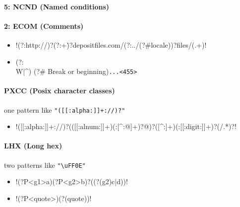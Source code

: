 \vspace{-2mm}
\paragraph{5: NCND (Named conditions)}

\vspace{-2mm}
\paragraph{2: ECOM (Comments)}
\begin{itemize}[noitemsep,topsep=0pt]
\item \cverb!(?:http://)?(?:\w+\.)?depositfiles.com/(?:../(?#locale))?files/(.+)!
\item \cverb@\n                     (?:\\W|^)    (?# Break or beginning)\n@\verb!...<455>!
\end{itemize}

\vspace{-2mm}
\paragraph{PXCC (Posix character classes)} one pattern like \verb!"([[:alpha:]]+://)?"!
\begin{itemize}[noitemsep,topsep=0pt]
\item \cverb!([[:alpha:]]+://)?(([[:alnum:]]+)(:[^:@]+)?@)?([^:]+)(:[[:digit:]]+)?(/.*)?!
\end{itemize}

\vspace{-2mm}
\paragraph{LHX (Long hex)} two patterns like \verb!"\uFF0E"!
\begin{itemize}[noitemsep,topsep=0pt]
\item \cverb!(?P<g1>a)(?P<g2>b)?((?(g2)c|d))!
\item \cverb!(?P<quote>)(?(quote))!
\end{itemize}

